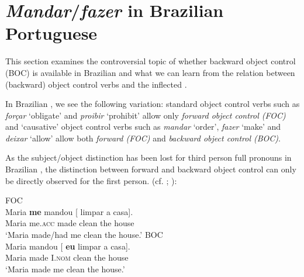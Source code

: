 \documentclass[output=paper]{langsci/langscibook}
\begin{document}
\section{\textit{Mandar}/\textit{fazer} in Brazilian Portuguese}%

This section examines the controversial topic of whether backward object control (BOC) is available in Brazilian  and what we can learn from the relation between (backward) object control verbs and the inflected .

In Brazilian , we see the following variation: standard object control verbs such as \textit{forçar} ‘obligate’ and \textit{proibir} ‘prohibit’ allow only \textit{forward object control (FOC)}  and ‘causative’ object control verbs such as \textit{mandar} ‘order’, \textit{fazer} ‘make’ and \textit{deixar} ‘allow’ allow both \textit{forward (FOC)} and \textit{backward object control (BOC)}.  

As the subject\slash object distinction has been lost for third person full pronouns in Brazilian , the distinction between forward and backward object control can only be directly observed for the first person. (cf. \citealt{Farrell1995}; \citealt{Boeckx2004,Boeckx2006}):

\ea%
    \label{ex:moreno:5}
    \z
\z    



\ea%
    \label{ex:moreno:6}
    \ea  FOC\\
    \gll Maria  \textbf{me}        mandou  [ limpar a    casa].      \\
         Maria  me.\textsc{acc} made     {}  clean   the house\\
    \glt ‘Maria made/had me clean the house.’
    \ex  BOC \\
    \gll Maria mandou [ \textbf{eu}        limpar a   casa].      \\
         Maria made     {}  I.\textsc{nom}  clean  the house\\
    \glt ‘Maria made me clean the house.’
    \z
\z    
\end{document}
